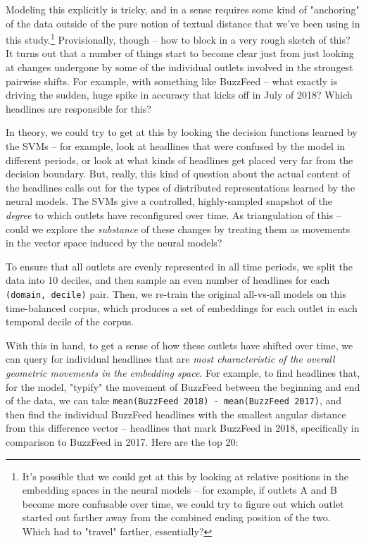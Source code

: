 \documentclass{scrartcl}
\begin{document}
Modeling this explicitly is tricky, and in a sense requires some kind of "anchoring" of the data outside of the pure notion of textual distance that we've been using in this study.\footnote{It's possible that we could get at this by looking at relative positions in the embedding spaces in the neural models -- for example, if outlets A and B become more confusable over time, we could try to figure out which outlet started out farther away from the combined ending position of the two. Which had to "travel" farther, essentially?} Provisionally, though -- how to block in a very rough sketch of this? It turns out that a number of things start to become clear just from just looking at changes undergone by some of the individual outlets involved in the strongest pairwise shifts. For example, with something like BuzzFeed -- what exactly is driving the sudden, huge spike in accuracy that kicks off in July of 2018? Which headlines are responsible for this?

In theory, we could try to get at this by looking the decision functions learned by the SVMs -- for example, look at headlines that were confused by the model in different periods, or look at what kinds of headlines get placed very far from the decision boundary. But, really, this kind of question about the actual content of the headlines calls out for the types of distributed representations learned by the neural models. The SVMs give a controlled, highly-sampled snapshot of the \textit{degree} to which outlets have reconfigured over time. As triangulation of this -- could we explore the \textit{substance} of these changes by treating them as movements in the vector space induced by the neural models?

To ensure that all outlets are evenly represented in all time periods, we split the data into 10 deciles, and then sample an even number of headlines for each \texttt{(domain, decile)} pair. Then, we re-train the original all-vs-all models on this time-balanced corpus, which produces a set of embeddings for each outlet in each temporal decile of the corpus.

With this in hand, to get a sense of how these outlets have shifted over time, we can query for individual headlines that are \textit{most characteristic of the overall geometric movements in the embedding space}. For example, to find headlines that, for the model, "typify" the movement of BuzzFeed between the beginning and end of the data, we can take \texttt{mean(BuzzFeed 2018) - mean(BuzzFeed 2017)}, and then find the individual BuzzFeed headlines with the smallest angular distance from this difference vector -- headlines that mark BuzzFeed in 2018, specifically in comparison to BuzzFeed in 2017. Here are the top 20:
\end{document}
